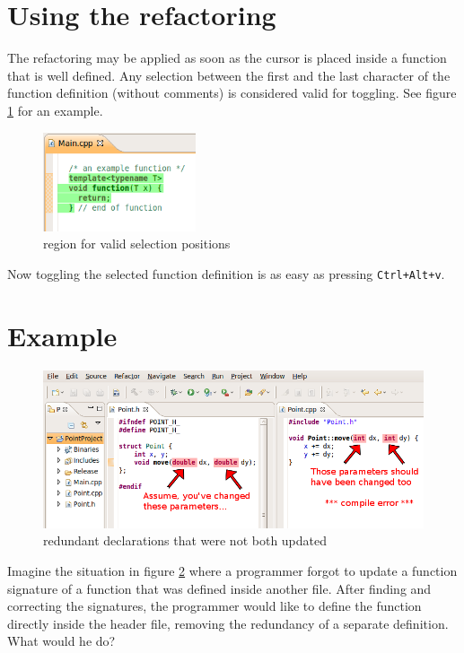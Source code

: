 \section{Using the refactoring}

The refactoring may be applied as soon as the cursor is placed inside a function 
that is well defined. Any selection between the first and the last character of 
the function definition (without comments) is considered valid for toggling. See 
figure \ref{selection} for an example.
\begin{figure}[h]
\centering
\includegraphics[width=0.4\textwidth]{images/selection.png}
\caption{region for valid selection positions}
\label{selection}
\end{figure}

Now toggling the selected function definition is as easy as pressing 
\texttt{Ctrl+Alt+v}.

\section{Example}

\begin{figure}[h]
\centering
\includegraphics[width=\textwidth]{images/differing_signatures.png}
\caption{redundant declarations that were not both updated}
\label{differingSignatures}
\end{figure}
Imagine the situation in figure \ref{differingSignatures} where a programmer 
forgot to update a function signature of a function that was defined inside 
another file.
After finding and correcting the signatures, the programmer would like to define 
the function directly inside the header file, removing the redundancy of a 
separate definition. What would he do?

